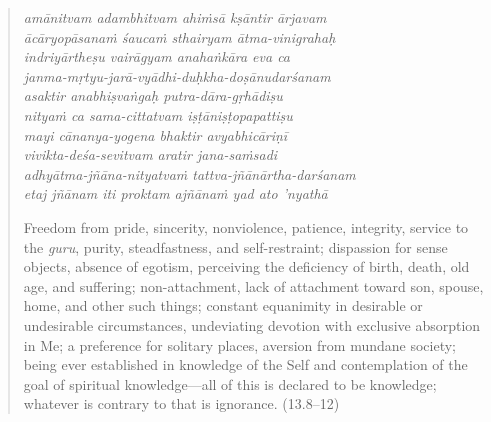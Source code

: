 \documentclass[12pt, twoside, openright]{memoir}
\begin{document}
\par
\begin{verse}
\textit{amānitvam adambhitvam ahiṁsā kṣāntir ārjavam} \\
\textit{ācāryopāsanaṁ śaucaṁ sthairyam ātma-vinigrahaḥ} \\
\textit{indriyārtheṣu vairāgyam anahaṅkāra eva ca} \\
\textit{janma-mṛtyu-jarā-vyādhi-duḥkha-doṣānudarśanam} \\
\textit{asaktir anabhiṣvaṅgaḥ putra-dāra-gṛhādiṣu} \\
\textit{nityaṁ ca sama-cittatvam iṣṭāniṣṭopapattiṣu} \\
\textit{mayi cānanya-yogena bhaktir avyabhicāriṇī} \\
\textit{vivikta-deśa-sevitvam aratir jana-saṁsadi} \\
\textit{adhyātma-jñāna-nityatvaṁ tattva-jñānārtha-darśanam} \\
\textit{etaj jñānam iti proktam ajñānaṁ yad ato ’nyathā}

\noindent Freedom from pride, sincerity, nonviolence, patience, integrity, service to the \textit{guru}, purity, steadfastness, and self-restraint; dispassion for sense objects, absence of egotism, perceiving the deficiency of birth, death, old age, and suffering; non-attachment, lack of attachment toward son, spouse, home, and other such things; constant equanimity in desirable or undesirable circumstances, undeviating devotion with exclusive absorption in Me; a preference for solitary places, aversion from mundane society; being ever established in knowledge of the Self and contemplation of the goal of spiritual knowledge---all of this is declared to be knowledge; whatever is contrary to that is ignorance. (13.8–12)
\end{verse}
\par
\end{document}
